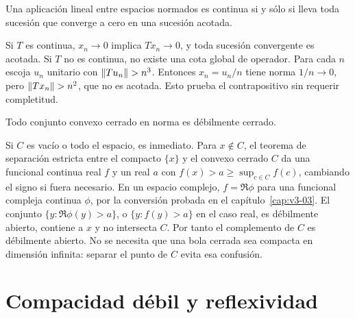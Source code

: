 \begin{ejercicio}\label{ej:v3-l15-3}
Una aplicación lineal entre espacios normados es continua si y sólo si lleva toda sucesión que converge a cero en una sucesión acotada.
\end{ejercicio}
\begin{solucion}
Si $T$ es continua, $x_n\to0$ implica $Tx_n\to0$, y toda sucesión convergente es acotada. Si $T$ no es continua, no existe una cota global de operador. Para cada $n$ escoja $u_n$ unitario con $\left\lVert Tu_n\right\rVert>n^3$. Entonces $x_n=u_n/n$ tiene norma $1/n\to0$, pero $\left\lVert Tx_n\right\rVert>n^2$, que no es acotada. Esto prueba el contrapositivo sin requerir completitud.
\end{solucion}

\begin{ejercicio}\label{ej:v3-l15-4}
Todo conjunto convexo cerrado en norma es débilmente cerrado.
\end{ejercicio}
\begin{solucion}
Si $C$ es vacío o todo el espacio, es inmediato. Para $x\notin C$, el teorema de separación estricta entre el compacto $\{x\}$ y el convexo cerrado $C$ da una funcional continua real $f$ y un real $a$ con $f(x)>a\ge\sup_{c\in C}f(c)$, cambiando el signo si fuera necesario. En un espacio complejo, $f=\Re\phi$ para una funcional compleja continua $\phi$, por la conversión probada en el capítulo~\ref{cap:v3-03}. El conjunto $\{y:\Re\phi(y)>a\}$, o $\{y:f(y)>a\}$ en el caso real, es débilmente abierto, contiene a $x$ y no intersecta $C$. Por tanto el complemento de $C$ es débilmente abierto. No se necesita que una bola cerrada sea compacta en dimensión infinita: separar el punto de $C$ evita esa confusión.
\end{solucion}

\chapter{Compacidad débil y reflexividad}

